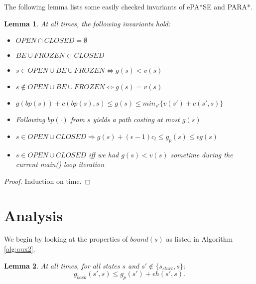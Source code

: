 \documentclass[letterpaper]{article}
\newtheorem{lemma}{Lemma}
\begin{document}
The following lemma lists some easily checked invariants of ePA*SE and PARA*.

\begin{lemma}
\label{lem:prop}
At all times, the following invariants hold:
\begin{itemize}
\item $OPEN\cap CLOSED = \emptyset$
\item $BE\cup FROZEN \subset CLOSED$
\item $s\in OPEN\cup BE\cup FROZEN \Leftrightarrow g(s) < v(s)$
\item $s\notin OPEN\cup BE\cup FROZEN \Leftrightarrow g(s) = v(s)$
\item $g(bp(s)) + c(bp(s),s) \le g(s) \le min_{s'}\{v(s') + c(s',s)\}$
\item Following $bp(\cdot)$ from $s$ yields a path costing at most $g(s)$
\item $s\in OPEN\cup CLOSED \Rightarrow g(s) + (\epsilon-1)c_l \le g_p(s) \le \epsilon g(s)$
\item $s\in OPEN\cup CLOSED$ iff we had $g(s)<v(s)$ sometime during the current main() loop iteration
\end{itemize}
\end{lemma}

\begin{proof}
Induction on time.
\end{proof}

\section{Analysis}

We begin by looking at the properties of $bound(s)$ as listed in Algorithm \ref{alg:aux2}.

\begin{lemma}
\label{lem:indep}
At all times, for all states $s$ and $s'\notin \{s_{start},s\}$:
\[g_{back}(s',s) \le g_p(s') + \epsilon h(s',s).\]
\end{lemma}
\end{document}
